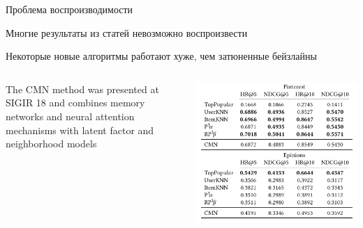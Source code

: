 \documentclass[11pt,aspectratio=169]{beamer}
\begin{document}
\begin{frame}{Проблема воспроизводимости \cite{PROGRESS}}

\begin{tcolorbox}[colback=warn!5,colframe=warn!80,title=]
Многие результаты из статей невозможно воспроизвести
\end{tcolorbox}

\begin{tcolorbox}[colback=warn!5,colframe=warn!80,title=]
Некоторые новые алгоритмы работают хуже, чем затюненные бейзлайны
\end{tcolorbox}

\begin{columns}
\begin{column}{0.45\textwidth} 
\begin{tcolorbox}[colback=gray!5,colframe=gray!80,title=]
The CMN method was presented at SIGIR 18 and combines memory networks and neural attention mechanisms with latent factor and neighborhood models
\end{tcolorbox}
\end{column}
\begin{column}{0.45\textwidth}
\begin{center}
\includegraphics[scale=0.25]{images/progress.png}
\end{center}
\end{column}
\end{columns}

\end{frame}
\end{document}
